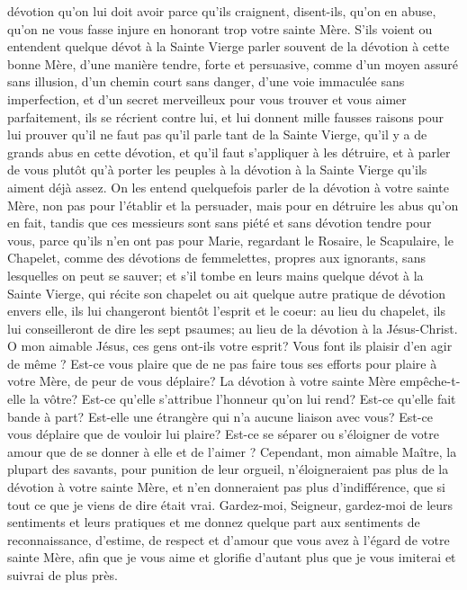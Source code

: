 dévotion qu'on lui doit avoir parce qu'ils craignent, disent-ils, qu'on en abuse, qu'on ne vous fasse injure en
honorant trop votre sainte Mère. S'ils voient ou entendent quelque dévot à la Sainte Vierge parler souvent de la
dévotion à cette bonne Mère, d'une manière tendre, forte et persuasive, comme d'un moyen assuré sans illusion,
d'un chemin court sans danger, d'une voie immaculée sans imperfection, et d'un secret merveilleux pour vous
trouver et vous aimer parfaitement, ils se récrient contre lui, et lui donnent mille fausses raisons pour lui prouver
qu'il ne faut pas qu'il parle tant de la Sainte Vierge, qu'il y a de grands abus en cette dévotion, et qu'il faut
s'appliquer à les détruire, et à parler de vous plutôt qu'à porter les peuples à la dévotion à la Sainte Vierge qu'ils
aiment déjà assez.
On les entend quelquefois parler de la dévotion à votre sainte Mère, non pas pour l'établir et la persuader, mais
pour en détruire les abus qu'on en fait, tandis que ces messieurs sont sans piété et sans dévotion tendre pour
vous, parce qu'ils n'en ont pas pour Marie, regardant le Rosaire, le Scapulaire, le Chapelet, comme des dévotions
de femmelettes, propres aux ignorants, sans lesquelles on peut se sauver; et s'il tombe en leurs mains quelque
dévot à la Sainte Vierge, qui récite son chapelet ou ait quelque autre pratique de dévotion envers elle, ils lui
changeront bientôt l'esprit et le coeur: au lieu du chapelet, ils lui conseilleront de dire les sept psaumes; au lieu de
la dévotion à la Jésus-Christ.
O mon aimable Jésus, ces gens ont-ils votre esprit? Vous font ils plaisir d'en agir de même ? Est-ce vous plaire
que de ne pas faire tous ses efforts pour plaire à votre Mère, de peur de vous déplaire? La dévotion à votre sainte
Mère empêche-t-elle la vôtre? Est-ce qu'elle s'attribue l'honneur qu'on lui rend? Est-ce qu'elle fait bande à part?
Est-elle une étrangère qui n'a aucune liaison avec vous? Est-ce vous déplaire que de vouloir lui plaire? Est-ce se
séparer ou s'éloigner de votre amour que de se donner à elle et de l'aimer ?
 Cependant, mon aimable Maître, la plupart des savants, pour punition de leur orgueil, n'éloigneraient pas plus
de la dévotion à votre sainte Mère, et n'en donneraient pas plus d'indifférence, que si tout ce que je viens de dire
était vrai. Gardez-moi, Seigneur, gardez-moi de leurs sentiments et leurs pratiques et me donnez quelque part aux
sentiments de reconnaissance, d'estime, de respect et d'amour que vous avez à l'égard de votre sainte Mère, afin
que je vous aime et glorifie d'autant plus que je vous imiterai et suivrai de plus près.
